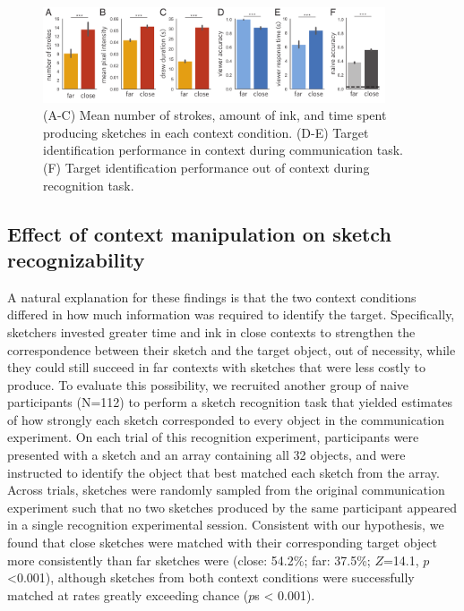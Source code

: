 \documentclass[9pt,twocolumn,twoside]{pnas-new}
\begin{document}
\begin{figure}[htbp]
\centering
\includegraphics[width=0.9\textwidth]{figures/3_behavioral_performance.pdf}
\caption{(A-C) Mean number of strokes, amount of ink, and time spent producing sketches in each context condition. (D-E) Target identification performance in context during communication task. (F) Target identification performance out of context during recognition task.}
\label{task_performance}
\end{figure}


\subsection*{Effect of context manipulation on sketch recognizability}

A natural explanation for these findings is that the two context conditions differed in how much information was required to identify the target. 
Specifically, sketchers invested greater time and ink in close contexts to strengthen the correspondence between their sketch and the target object, out of necessity, while they could still succeed in far contexts with sketches that were less costly to produce.
To evaluate this possibility, we recruited another group of naive participants (N=112) to perform a sketch recognition task that yielded estimates of how strongly each sketch corresponded to every object in the communication experiment. 
On each trial of this recognition experiment, participants were presented with a sketch and an array containing all 32 objects, and were instructed to identify the object that best matched each sketch from the array. 
Across trials, sketches were randomly sampled from the original communication experiment such that no two sketches produced by the same participant appeared in a single recognition experimental session. 
Consistent with our hypothesis, we found that close sketches were matched with their corresponding target object more consistently than far sketches were (close: 54.2\%; far: 37.5\%; $Z$=14.1, $p$<0.001), although sketches from both context conditions were successfully matched at rates greatly exceeding chance ($p$s < 0.001).
\end{document}
